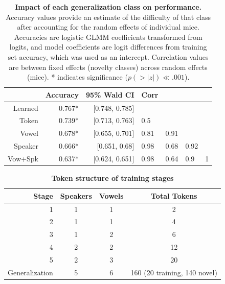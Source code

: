\begin{table}[h!]
\caption{\textbf{Impact of each generalization class on performance.} Accuracy values provide an estimate of the difficulty of that class after accounting for the random effects of individual mice. Accuracies are logistic GLMM coefficients transformed from logits, and model coefficients are logit differences from training set accuracy, which was used as an intercept. Correlation values are between fixed effects (novelty classes) across random effects (mice). * indicates significance ($p(>|z|)\ll.001$).}
\label{lmmtab}
\begin{tabularx}{\linewidth}{rrr|llll}
  \hline
 & Accuracy & 95\% Wald CI & Corr &  &  &  \\ 
  \hline
Learned & 0.767* & [0.748, 0.785] &  &  &  &  \\ 
  Token & 0.739* & [0.713, 0.763] & 0.5 &  &  &  \\ 
  Vowel & 0.678* & [0.655, 0.701] & 0.81 & 0.91 &  &  \\ 
  Speaker & 0.666* & [0.651, 0.68] & 0.98 & 0.68 & 0.92 &  \\ 
  Vow+Spk & 0.637* & [0.624, 0.651] & 0.98 & 0.64 & 0.9 & 1 \\ 
   \hline
\end{tabularx}

\end{table}

\vspace{0.5in}

\begin{table}[h!]
\label{trainsteps}
\caption{\textbf{Token structure of training stages}}
\begin{tabularx}{\linewidth}{rccc}
\toprule
Stage & Speakers & Vowels & Total Tokens\\
\midrule
1 & 1 & 1 & 2\\
2 & 1 & 1 & 4\\
3 & 1 & 2 & 6\\
4 & 2 & 2 & 12\\
5 & 2 & 3 & 20\\
Generalization & 5 & 6 & 160 (20 training, 140 novel)\\
\bottomrule
\end{tabularx}

\end{table}

